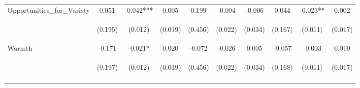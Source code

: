 \begin{tabular}{lccccccccc}
\noalign{\smallskip}Opportunities_for_Variety & 0.051 & -0.042*** & 0.005 & 0.199 & -0.004 & -0.006 & 0.044 & -0.023** & 0.002\\
 & \begin{footnotesize}(0.195)\end{footnotesize} & \begin{footnotesize}(0.012)\end{footnotesize} & \begin{footnotesize}(0.019)\end{footnotesize} & \begin{footnotesize}(0.456)\end{footnotesize} & \begin{footnotesize}(0.022)\end{footnotesize} & \begin{footnotesize}(0.034)\end{footnotesize} & \begin{footnotesize}(0.167)\end{footnotesize} & \begin{footnotesize}(0.011)\end{footnotesize} & \begin{footnotesize}(0.017)\end{footnotesize}\\
\noalign{\smallskip}Warmth & -0.171 & -0.021* & 0.020 & -0.072 & -0.026 & 0.005 & -0.057 & -0.003 & 0.010\\
 & \begin{footnotesize}(0.197)\end{footnotesize} & \begin{footnotesize}(0.012)\end{footnotesize} & \begin{footnotesize}(0.019)\end{footnotesize} & \begin{footnotesize}(0.456)\end{footnotesize} & \begin{footnotesize}(0.022)\end{footnotesize} & \begin{footnotesize}(0.034)\end{footnotesize} & \begin{footnotesize}(0.168)\end{footnotesize} & \begin{footnotesize}(0.011)\end{footnotesize} & \begin{footnotesize}(0.017)\end{footnotesize}\\
\noalign{\smallskip}\hline\end{tabular}\\

